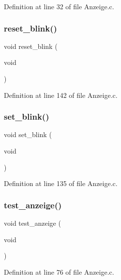 Definition at line 32 of file Anzeige.\+c.

\mbox{\label{_anzeige_8c_a708d9da23b8063834127863164a0f33f}} 
\subsubsection{reset\+\_\+blink()}
{\footnotesize\ttfamily void reset\+\_\+blink (\begin{DoxyParamCaption}\item[{void}]{ }\end{DoxyParamCaption})}



Definition at line 142 of file Anzeige.\+c.

\mbox{\label{_anzeige_8c_ab9f6ef1481129e65b858d36f459165e3}} 
\subsubsection{set\+\_\+blink()}
{\footnotesize\ttfamily void set\+\_\+blink (\begin{DoxyParamCaption}\item[{void}]{ }\end{DoxyParamCaption})}



Definition at line 135 of file Anzeige.\+c.

\mbox{\label{_anzeige_8c_ab1867dec374e397f64ee229d3df859da}} 
\subsubsection{test\+\_\+anzeige()}
{\footnotesize\ttfamily void test\+\_\+anzeige (\begin{DoxyParamCaption}\item[{void}]{ }\end{DoxyParamCaption})}



Definition at line 76 of file Anzeige.\+c.

\mbox{\label{_anzeige_8c_a93ae59176926d27b726ee1cc5e53a2c9}} 
